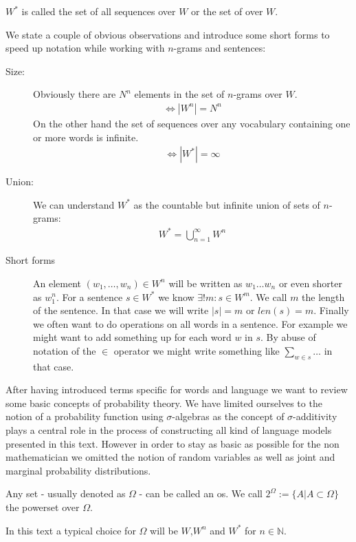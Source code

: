 \documentclass[•]{book}
\begin{document}
\begin{definition}
$W^{*}$ is called the set of all sequences over $W$ or the set of  over $W$.
\end{definition}

\begin{remark}
We state a couple of obvious observations and introduce some short forms to speed up notation while working with $n$-grams and sentences:
\begin{description}
\item[Size:] Obviously there are $N^n$ elements in the set of $n$-grams over $W$.
\begin{align}
\Leftrightarrow|W^{n}|=N^n
\end{align}
On the other hand the set of sequences over any vocabulary containing one or more words is infinite.
\begin{align}
\Leftrightarrow |W^{*}|=\infty
\end{align}
\item[Union:] We can understand $W^{*}$ as the countable but infinite union of sets of $n$-grams:
\begin{align}
W^{*}=\bigcup_{n=1}^\infty W^n
\end{align}
\item[Short forms] An element $(w_1,\dots,w_n) \in W^n$ will be written as $w_1\dots w_n$ or even shorter as $w_1^n$. For a sentence $s\in W^{*}$ we know $\exists ! m : s\in W^m$. We call $m$ the length of the sentence. In that case we will write $|s|=m$ or $len(s)=m$. Finally we often want to do operations on all words in a sentence. For example we might want to add something up for each word $w$ in $s$. By abuse of notation of the $\in$ operator we might write something like $\sum\limits_{w\in s}\dots$ in that case.
\end{description}
\end{remark}

After having introduced terms specific for words and language we want to review some basic concepts of probability theory. 
We have limited ourselves to the notion of a probability function using $\sigma$-algebras as the concept of $\sigma$-additivity plays a central role in the process of constructing all kind of language models presented in this text.
However in order to stay as basic as possible for the non mathematician we omitted the notion of random variables as well as joint and marginal probability distributions.

\begin{definition}
Any set - usually denoted as $\Omega$ - can be called an \gls{os}. 
We call $2^\Omega:=\{A| A\subset \Omega\}$ the \gls{powerset} over $\Omega$.
\end{definition}
In this text a typical choice for $\Omega$ will be $W$,$W^n$ and $W^{*}$ for $n\in\mathbb{N}$.
\end{document}
